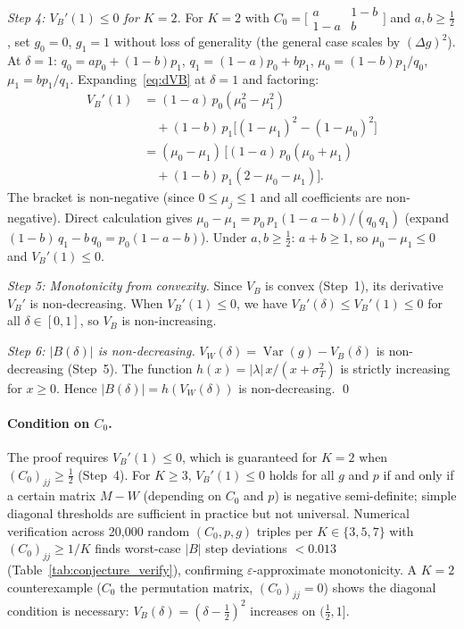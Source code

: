 \emph{Step 4: $V_B'(1)\leq 0$ for $K{=}2$.}
For $K{=}2$ with $C_0=\bigl[\begin{smallmatrix}a&1{-}b\\1{-}a&b\end{smallmatrix}\bigr]$ and $a,b\geq\tfrac{1}{2}$,
set $g_0{=}0$, $g_1{=}1$ without loss of generality
(the general case scales by $(\Delta g)^2$).
At $\delta{=}1$: $q_0{=}ap_0{+}(1{-}b)p_1$, $q_1{=}(1{-}a)p_0{+}bp_1$,
$\mu_0{=}(1{-}b)p_1/q_0$, $\mu_1{=}bp_1/q_1$.
Expanding~\eqref{eq:dVB} at $\delta{=}1$ and factoring:
\begin{align*}
  V_B'(1) &= (1{-}a)\,p_0(\mu_0^2{-}\mu_1^2)\\
  &\quad{}+(1{-}b)\,p_1\bigl[(1{-}\mu_1)^2{-}(1{-}\mu_0)^2\bigr] \\
  &= (\mu_0{-}\mu_1)\,\bigl[(1{-}a)\,p_0(\mu_0{+}\mu_1)\\
  &\quad{}+(1{-}b)\,p_1(2{-}\mu_0{-}\mu_1)\bigr].
\end{align*}
The bracket is non-negative (since $0\leq\mu_j\leq 1$ and all coefficients are non-negative).
Direct calculation gives $\mu_0{-}\mu_1=p_0\,p_1(1{-}a{-}b)/(q_0\,q_1)$
(expand $(1{-}b)\,q_1-b\,q_0=p_0(1{-}a{-}b)$).
Under $a,b\geq\tfrac{1}{2}$: $a{+}b\geq 1$, so $\mu_0{-}\mu_1\leq 0$ and $V_B'(1)\leq 0$.

\emph{Step 5: Monotonicity from convexity.}
Since $V_B$ is convex (Step~1), its derivative $V_B'$ is non-decreasing.
When $V_B'(1)\leq 0$, we have $V_B'(\delta)\leq V_B'(1)\leq 0$ for all $\delta\in[0,1]$, so $V_B$ is non-increasing.

\emph{Step 6: $|B(\delta)|$ is non-decreasing.}
$V_W(\delta)=\operatorname{Var}(g)-V_B(\delta)$ is non-decreasing (Step~5).
The function $h(x)=|\lambda|\,x/(x+\sigma_T^2)$ is strictly increasing for $x\geq 0$.
Hence $|B(\delta)|=h(V_W(\delta))$ is non-decreasing. \qed

\paragraph{Condition on $C_0$.}
The proof requires $V_B'(1)\leq 0$, which is guaranteed for $K{=}2$ when $(C_0)_{jj}\geq\tfrac{1}{2}$ (Step~4).
For $K\geq 3$, $V_B'(1)\leq 0$ holds for all $g$ and $p$ if and only if a certain matrix $M-W$ (depending on $C_0$ and $p$) is negative semi-definite; simple diagonal thresholds are sufficient in practice but not universal.
Numerical verification across 20{,}000 random $(C_0,p,g)$ triples per $K\in\{3,5,7\}$ with $(C_0)_{jj}\geq 1/K$ finds worst-case $|B|$ step deviations $< 0.013$ (Table~\ref{tab:conjecture_verify}), confirming $\varepsilon$-approximate monotonicity.
A $K{=}2$ counterexample ($C_0$ the permutation matrix, $(C_0)_{jj}{=}0$) shows the diagonal condition is necessary: $V_B(\delta)=(\delta{-}\tfrac{1}{2})^2$ increases on $(\tfrac{1}{2},1]$.

